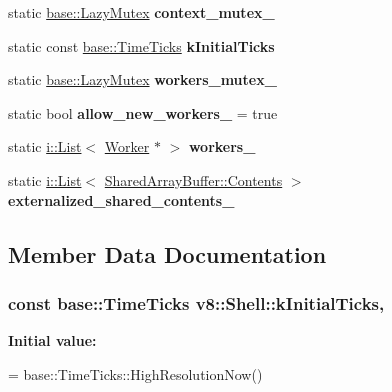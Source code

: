 \begin{DoxyCompactItemize}
\item 
static \hyperlink{structv8_1_1base_1_1_lazy_instance_impl}{base\+::\+Lazy\+Mutex} {\bfseries context\+\_\+mutex\+\_\+}\hypertarget{classv8_1_1_shell_ae7a857220b6f30c5aa255ca91e650c83}{}\label{classv8_1_1_shell_ae7a857220b6f30c5aa255ca91e650c83}

\item 
static const \hyperlink{classv8_1_1base_1_1_time_ticks}{base\+::\+Time\+Ticks} {\bfseries k\+Initial\+Ticks}
\item 
static \hyperlink{structv8_1_1base_1_1_lazy_instance_impl}{base\+::\+Lazy\+Mutex} {\bfseries workers\+\_\+mutex\+\_\+}\hypertarget{classv8_1_1_shell_a93a6927ea5799467bd80638a4d2d3cc5}{}\label{classv8_1_1_shell_a93a6927ea5799467bd80638a4d2d3cc5}

\item 
static bool {\bfseries allow\+\_\+new\+\_\+workers\+\_\+} = true\hypertarget{classv8_1_1_shell_a81de5b4ca09dc165b94db0ee54ec7da7}{}\label{classv8_1_1_shell_a81de5b4ca09dc165b94db0ee54ec7da7}

\item 
static \hyperlink{classv8_1_1internal_1_1_list}{i\+::\+List}$<$ \hyperlink{classv8_1_1_worker}{Worker} $\ast$ $>$ {\bfseries workers\+\_\+}\hypertarget{classv8_1_1_shell_af76823cebe196d9ff71611b97ef67db3}{}\label{classv8_1_1_shell_af76823cebe196d9ff71611b97ef67db3}

\item 
static \hyperlink{classv8_1_1internal_1_1_list}{i\+::\+List}$<$ \hyperlink{classv8_1_1_shared_array_buffer_1_1_contents}{Shared\+Array\+Buffer\+::\+Contents} $>$ {\bfseries externalized\+\_\+shared\+\_\+contents\+\_\+}\hypertarget{classv8_1_1_shell_a39591404142f49ab72e4379a90a7173a}{}\label{classv8_1_1_shell_a39591404142f49ab72e4379a90a7173a}

\end{DoxyCompactItemize}


\subsection{Member Data Documentation}
\subsubsection[{\texorpdfstring{k\+Initial\+Ticks}{kInitialTicks}}]{\setlength{\rightskip}{0pt plus 5cm}const {\bf base\+::\+Time\+Ticks} v8\+::\+Shell\+::k\+Initial\+Ticks\hspace{0.3cm}{\ttfamily [static]}, {\ttfamily [private]}}\hypertarget{classv8_1_1_shell_a99d31ba14620aa85df20e39e9df45597}{}\label{classv8_1_1_shell_a99d31ba14620aa85df20e39e9df45597}
{\bfseries Initial value\+:}
\begin{DoxyCode}
=
    base::TimeTicks::HighResolutionNow()
\end{DoxyCode}



